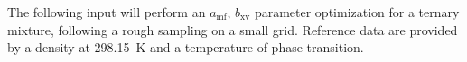 \documentclass{scrartcl}
\newcommand{\amf}{a_\mathrm{mf}}
\newcommand{\bxv}{b_\mathrm{xv}}
\begin{document}
%
%
%
%
%
%

The following input will perform an $\amf$, $\bxv$ parameter optimization for a ternary mixture, following a rough sampling on a small grid.
Reference data are provided by a density at \SI{298.15}{K} and a temperature of phase transition.

\
\end{document}
